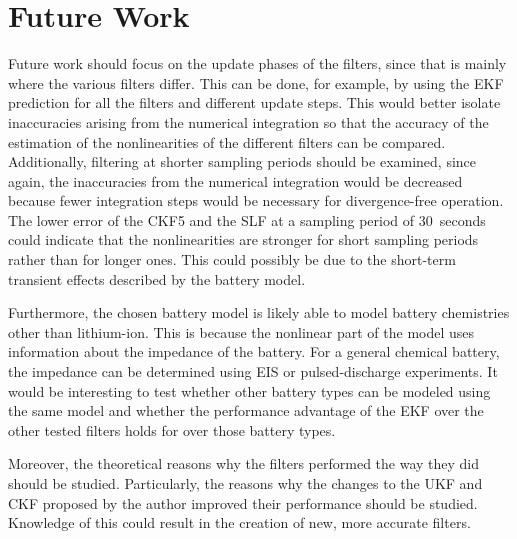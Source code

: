 \documentclass[../zhang_thesis.tex]{subfiles}
\begin{document}
\section{Future Work}

Future work should focus on the update phases of the filters, since that is mainly where the various filters differ. This can be done, for example, by using the EKF prediction for all the filters and different update steps. This would better isolate inaccuracies arising from the numerical integration so that the accuracy of the estimation of the nonlinearities of the different filters can be compared. Additionally, filtering at shorter sampling periods should be examined,
since again, the inaccuracies from the numerical integration would be decreased because fewer integration steps would be necessary for divergence-free operation. The lower error of the CKF5 and the SLF at a sampling period of 30~seconds could indicate that the nonlinearities are stronger for short sampling periods rather than for longer ones. This could possibly be due to the short-term transient effects described by the battery model.

Furthermore, the chosen battery model is likely able to model battery chemistries other than lithium-ion. This is because the nonlinear part of the model uses information about the impedance of the battery. For a general chemical battery, the impedance can be determined using EIS or pulsed-discharge experiments. It would be interesting to test whether other battery types can be modeled using the same model and whether the performance advantage of the EKF over the other tested filters holds for over those battery types.

Moreover, the theoretical reasons why the filters performed the way they did should be studied. Particularly, the reasons why the changes to the UKF and CKF proposed by the author improved their performance should be studied. Knowledge of this could result in the creation of new, more accurate filters.
\end{document}
